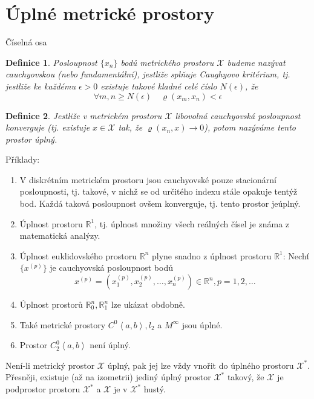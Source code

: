 \documentclass[a4paper, 11pt]{report}
\newtheorem{mydef}{Definice}[chapter]
\begin{document}
\section{Úplné metrické prostory}

Číselná osa

\begin{mydef}
Posloupnost $\{x_n\}$ bodů metrického prostoru $\mathcal{X}$ budeme nazývat \emph{cauchyovskou} (nebo \emph{fundamentální}), jestliže splňuje Caughyovo kritérium, tj. jestliže ke každému $\epsilon > 0$ existuje takové kladné celé číslo $N(\epsilon)$, že
$$ \forall m,n \geq N(\epsilon) \quad \varrho(x_m, x_n) < \epsilon $$
\end{mydef}

\begin{mydef}
Jestliže v metrickém prostoru $\mathcal{X}$ libovolná cauchyovská posloupnost konverguje (tj. existuje $x \in \mathcal{X}$ tak, že $\varrho(x_n, x) \to 0$), potom nazýváme tento prostor \emph{úplný}.
\end{mydef}

Příklady:
\begin{enumerate}
	\item V diskrétním metrickém prostoru jsou cauchyovské pouze stacionární posloupnosti, tj. takové, v nichž se od určitého indexu stále opakuje tentýž bod. Každá taková posloupnost ovšem konverguje, tj. tento prostor jeúplný.
	\item Úplnost prostoru $\mathbb{R}^1$, tj. úplnost množiny všech reálných čísel je známa z matematická analýzy.
	\item Úplnost euklidovského prostoru $\mathbb{R}^n$ plyne snadno z úplnost prostoru $\mathbb{R}^1$: Nechť $\{x^{(p)}\}$ je cauchyovská posloupnost bodů
	$$ x^{(p)} = (x^{(p)}_1, x^{(p)}_2, \dots, x^{(p)}_n) \in \mathbb{R}^n, p = 1, 2, \dots $$
	\item Úplnost prostorů $\mathbb{R}^n_0, \mathbb{R}^n_1$ lze ukázat obdobně.
	\item Také metrické prostory $C^0 \left<a, b \right>, l_2$ a $M^\infty$ jsou úplné.
	\item Prostor $C_2^0 \left<a, b \right>$ není úplný.
\end{enumerate}

Není-li metrický prostor $\mathcal{X}$ úplný, pak jej lze vždy vnořit do úplného prostoru $\mathcal{X}^*$. Přesněji, existuje (až na izometrii) jediný úplný prostor $\mathcal{X}^*$ takový, že $\mathcal{X}$ je podprostor prostoru $\mathcal{X}^*$ a $\mathcal{X}$ je v $\mathcal{X}^*$ hustý.
\end{document}
